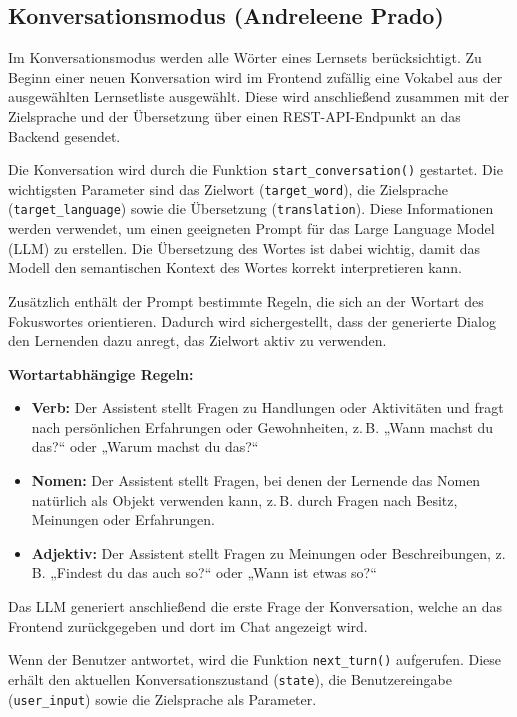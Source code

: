 \subsection{Konversationsmodus (Andreleene Prado)}
Im Konversationsmodus werden alle Wörter eines Lernsets berücksichtigt. 
Zu Beginn einer neuen Konversation wird im Frontend zufällig eine Vokabel aus der ausgewählten Lernsetliste ausgewählt. 
Diese wird anschließend zusammen mit der Zielsprache und der Übersetzung über einen REST-API-Endpunkt an das Backend gesendet.

Die Konversation wird durch die Funktion \texttt{start\_conversation()} gestartet. 
Die wichtigsten Parameter sind das Zielwort (\texttt{target\_word}), die Zielsprache (\texttt{target\_language}) sowie die Übersetzung (\texttt{translation}). 
Diese Informationen werden verwendet, um einen geeigneten Prompt für das Large Language Model (LLM) zu erstellen. 
Die Übersetzung des Wortes ist dabei wichtig, damit das Modell den semantischen Kontext des Wortes korrekt interpretieren kann.

Zusätzlich enthält der Prompt bestimmte Regeln, die sich an der Wortart des Fokuswortes orientieren. 
Dadurch wird sichergestellt, dass der generierte Dialog den Lernenden dazu anregt, das Zielwort aktiv zu verwenden.

\textbf{Wortartabhängige Regeln:}
\begin{itemize}
    \item \textbf{Verb:} Der Assistent stellt Fragen zu Handlungen oder Aktivitäten und fragt nach persönlichen Erfahrungen oder Gewohnheiten, z.\,B. „Wann machst du das?“ oder „Warum machst du das?“
    \item \textbf{Nomen:} Der Assistent stellt Fragen, bei denen der Lernende das Nomen natürlich als Objekt verwenden kann, z.\,B. durch Fragen nach Besitz, Meinungen oder Erfahrungen.
    \item \textbf{Adjektiv:} Der Assistent stellt Fragen zu Meinungen oder Beschreibungen, z.\,B. „Findest du das auch so?“ oder „Wann ist etwas so?“
\end{itemize}

Das LLM generiert anschließend die erste Frage der Konversation, welche an das Frontend zurückgegeben und dort im Chat angezeigt wird.

Wenn der Benutzer antwortet, wird die Funktion \texttt{next\_turn()} aufgerufen. 
Diese erhält den aktuellen Konversationszustand (\texttt{state}), die Benutzereingabe (\texttt{user\_input}) sowie die Zielsprache als Parameter.

